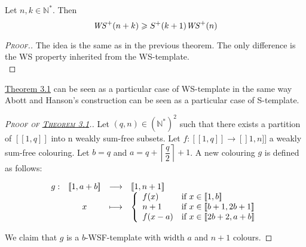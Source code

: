 \begin{corollary}
Let \(n, k \in \mathbb{N}^*\). Then
\[
\mathit{WS}^+(n+k) \geqslant S^+(k+1) \mathit{WS}^+(n)
\]
\end{corollary}

\begin{proof}[\textsc{Proof.}]
The idea is the same as in the previous theorem. The only difference is the WS property inherited
from the WS-template. \\
\end{proof}

\hyperref[Theorem3.1]{Theorem 3.1} can be seen as a particular case of WS-template in the same way Abott and Hanson's 
construction can be seen as a particular case of S-template.

\begin{proof}[\textsc{Proof of \hyperref[Theorem3.1]{Theorem 3.1}.}]
\label{PreuveThm}
Let \((q, n) \in (\mathbb{N}^*)^2\) such that there exists a partition of \([\![1, q]\!]\) into n weakly sum-free subsets. 
Let \(f: [\![1, q]\!] \rightarrow [\!]1, n]\!]\) a weakly sum-free colouring.
Let \(b=q\) and \(a = q + \left \lceil \dfrac{q}{2} \right \rceil + 1\). A new colouring \(g\) is defined as follows:

\[
\begin{array}{c c c l}
	g : & [\![1, a + b]\!] & \longrightarrow & [\![1, n + 1]\!] \\
	& x & \longmapsto &
		\left\{ \begin{array}{l l}
			f(x) & \text{if}~x \in [\![1, b]\!]  \\
			n + 1 & \text{if}~x \in [\![b + 1, 2 b + 1]\!] \\
			f(x - a) & \text{if}~x \in  [\![2 b + 2, a + b]\!]
		\end{array} \right.
\end{array}
\]

We claim that \(g\) is a \(b\)-WSF-template with width \(a\) and \(n + 1\) colours.


\end{proof}
